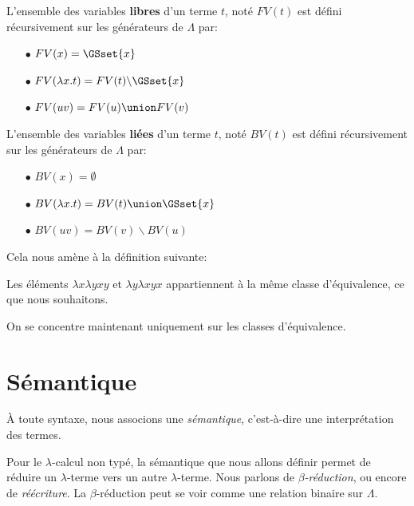 \begin{definition} 
  L'ensemble des variables \textbf{libres} d'un terme $t$, noté $FV(t)$ est défini
  récursivement sur les générateurs de $\Lambda$ par:
  \begin{itemize}
  \item[$\bullet$] $FV(x) = \GSset{x}$
  \item[$\bullet$] $FV(\lambda x . t) = FV(t) \backslash \GSset{x}$
  \item[$\bullet$] $FV(u v) = FV(u) \union FV(v)$
  \end{itemize}
\end{definition}

\begin{definition} 
  L'ensemble des variables \textbf{liées} d'un terme $t$, noté $BV(t)$ est défini
  récursivement sur les générateurs de $\Lambda$ par:
  \begin{itemize}
  \item[$\bullet$] $BV(x) = \emptyset$
  \item[$\bullet$] $BV(\lambda x . t) = BV(t) \union \GSset{x}$
  \item[$\bullet$] $BV(u v) = BV(v) \backslash BV(u)$
  \end{itemize}
\end{definition}

Cela nous amène à la définition suivante:
\begin{definition} 
  
\end{definition}

Les éléments $\lambda x \lambda y xy$ et $\lambda y \lambda x yx$ appartiennent
à la même classe d'équivalence, ce que nous souhaitons.

On se concentre maintenant uniquement sur les classes d'équivalence.

\section{Sémantique}

À toute syntaxe, nous associons une \textit{sémantique}, c'est-à-dire une interprétation
des termes.

Pour le $\lambda$-calcul non typé, la sémantique que nous allons définir permet
de réduire un $\lambda$-terme vers un autre $\lambda$-terme. Nous parlons de
\textit{$\beta$-réduction}, ou encore de \textit{réécriture}. La
$\beta$-réduction peut se voir comme une relation binaire sur $\Lambda$.

